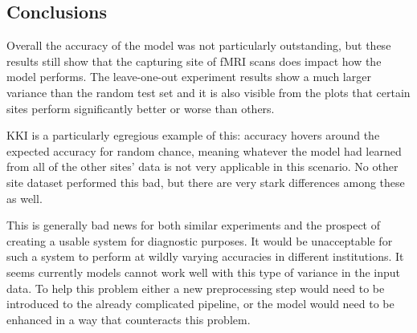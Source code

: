 	
	\subsection{Conclusions}
	
	
	Overall the accuracy of the model was not particularly outstanding, but these results still show that the capturing site of fMRI scans does impact how the model performs. The leave-one-out experiment results show a much larger variance than the random test set and it is also visible from the plots that certain sites perform significantly better or worse than others.
	
	KKI is a particularly egregious example of this: accuracy hovers around the expected accuracy for random chance, meaning whatever the model had learned from all of the other sites' data is not very applicable in this scenario. No other site dataset performed this bad, but there are very stark differences among these as well.
	
	This is generally bad news for both similar experiments and the prospect of creating a usable system for diagnostic purposes. It would be unacceptable for such a system to perform at wildly varying accuracies in different institutions. It seems currently models cannot work well with this type of variance in the input data. To help this problem either a new preprocessing step would need to be introduced to the already complicated pipeline, or the model would need to be enhanced in a way that counteracts this problem.
	
	
	
	
	
	
	
	
	
	
	
	
	